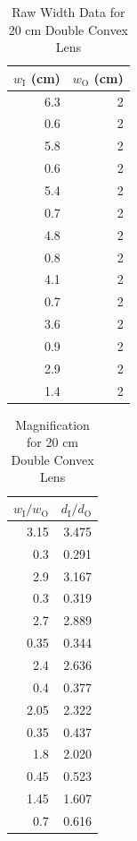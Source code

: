 \begin{table}[ht]
    \centering
    \begin{tabular}{r|r}
        $w_{\text{I}}$ (cm) & $w_{\text{O}}$ (cm) \\
        \hline
        6.3 & 2 \\
        0.6 & 2 \\
        5.8 & 2 \\
        0.6 & 2 \\
        5.4 & 2 \\
        0.7 & 2 \\
        4.8 & 2 \\
        0.8 & 2 \\
        4.1 & 2 \\
        0.7 & 2 \\
        3.6 & 2 \\
        0.9 & 2 \\
        2.9 & 2 \\
        1.4 & 2 \\
        \hline
    \end{tabular}
    \caption{Raw Width Data for 20 cm Double Convex Lens}
    \label{table.08.width.20cm}
\end{table}
%
\begin{table}[ht]
    \centering
    \begin{tabular}{r|r}
        $w_{\text{I}} / w_{\text{O}}$ & $d_{\text{I}} / d_{\text{O}}$ \\
        \hline
        3.15 & 3.475 \\
        0.3 & 0.291 \\
        2.9 & 3.167 \\
        0.3 & 0.319 \\
        2.7 & 2.889 \\
        0.35 & 0.344 \\
        2.4 & 2.636 \\
        0.4 & 0.377 \\
        2.05 & 2.322 \\
        0.35 & 0.437 \\
        1.8 & 2.020 \\
        0.45 & 0.523 \\
        1.45 & 1.607 \\
        0.7 & 0.616 \\
        \hline
    \end{tabular}
    \caption{Magnification for 20 cm Double Convex Lens}
    \label{table.08.magnification.20cm}
\end{table}

